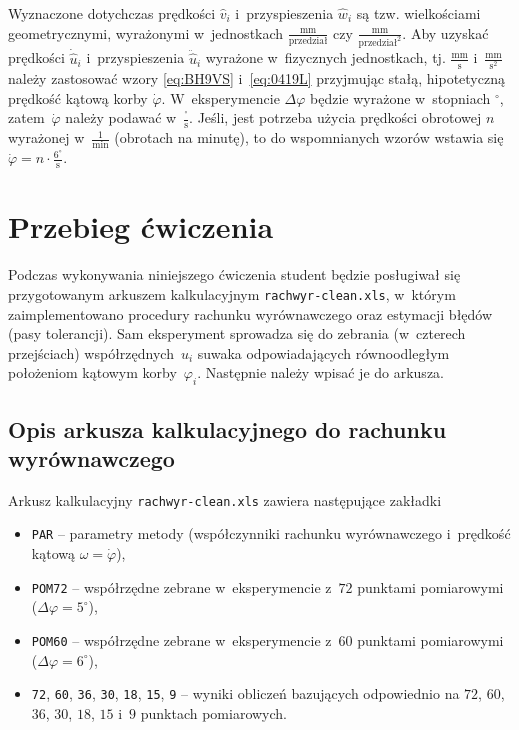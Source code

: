 \documentclass[paper=a4,DIV=12]{tmmlab}
\newcommand{\degree}{^{\circ}}
\begin{document}
Wyznaczone dotychczas prędkości $\hat{v}_i$ i~przyspieszenia $\hat{w}_i$ są
tzw. wielkościami geometrycznymi, wyrażonymi w~jednostkach
$\tfrac{\text{mm}}{\text{przedział}}$ czy
$\tfrac{\text{mm}}{\text{przedział}^2}$. Aby uzyskać prędkości
$\dot{\hat{u}}_i$ i~przyspieszenia $\ddot{\hat{u}}_i$ wyrażone w~fizycznych
jednostkach, tj. $\tfrac{\text{mm}}{\text{s}}$
i~$\tfrac{\text{mm}}{\text{s}^2}$ należy zastosować wzory \eqref{eq:BH9VS}
i~\eqref{eq:0419L} przyjmując stałą, hipotetyczną prędkość kątową korby
$\dot{\varphi}$. W~eksperymencie $\Delta\varphi$ będzie wyrażone w~stopniach
$\degree$, zatem~$\dot{\varphi}$ należy podawać w~$\tfrac{\degree}{\text{s}}$.
Jeśli, jest potrzeba użycia prędkości obrotowej $n$ wyrażonej
w~$\tfrac{1}{\text{min}}$ (obrotach na minutę), to do wspomnianych wzorów
wstawia się $\dot{\varphi} = n \cdot \tfrac{6\degree}{\text{s}}$.

\section{Przebieg ćwiczenia}
\label{sec:DAUVI}

Podczas wykonywania niniejszego ćwiczenia student będzie posługiwał się
przygotowanym arkuszem kalkulacyjnym \texttt{rachwyr-clean.xls}, w~którym
zaimplementowano procedury rachunku wyrównawczego oraz estymacji błędów (pasy
tolerancji). Sam eksperyment sprowadza się do zebrania (w~czterech przejściach)
współrzędnych~$u_i$ suwaka odpowiadających równoodległym położeniom kątowym
korby~$\varphi_i$. Następnie należy wpisać je do arkusza.

\subsection{Opis arkusza kalkulacyjnego do rachunku wyrównawczego}
\label{sec:HPTQY}

Arkusz kalkulacyjny \texttt{rachwyr-clean.xls} zawiera następujące zakładki
\begin{itemize}
  \item \texttt{PAR} -- parametry metody (współczynniki rachunku wyrównawczego
    i~prędkość kątową $\omega = \dot{\varphi}$),
  \item \texttt{POM72} -- współrzędne zebrane w~eksperymencie z~$72$ punktami
    pomiarowymi ($\Delta\varphi = 5\degree$),
  \item \texttt{POM60} -- współrzędne zebrane w~eksperymencie z~$60$ punktami
    pomiarowymi ($\Delta\varphi = 6\degree$),
  \item \texttt{72}, \texttt{60}, \texttt{36}, \texttt{30}, \texttt{18},
    \texttt{15}, \texttt{9} -- wyniki obliczeń bazujących odpowiednio na
    $72$, $60$, $36$, $30$, $18$, $15$ i~$9$ punktach pomiarowych.
\end{itemize}
\end{document}
